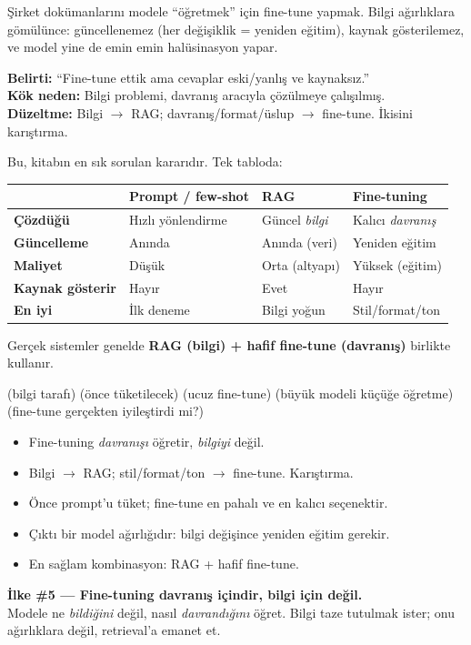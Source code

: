 \begin{antibox}
Şirket dokümanlarını modele ``öğretmek'' için fine-tune yapmak. Bilgi
ağırlıklara gömülünce: güncellenemez (her değişiklik = yeniden eğitim), kaynak
gösterilemez, ve model yine de emin emin halüsinasyon yapar.

\smallskip
\textbf{Belirti:} ``Fine-tune ettik ama cevaplar eski/yanlış ve kaynaksız.''\\
\textbf{Kök neden:} Bilgi problemi, davranış aracıyla çözülmeye çalışılmış.\\
\textbf{Düzeltme:} Bilgi $\to$ RAG; davranış/format/üslup $\to$ fine-tune. İkisini karıştırma.
\end{antibox}

Bu, kitabın en sık sorulan kararıdır. Tek tabloda:\par
\vspace{2pt}
\noindent\begin{tabularx}{\linewidth}{@{}>{\raggedright\arraybackslash}p{24mm} L L L@{}}
\toprule
{\sffamily\bfseries\small } &
{\sffamily\bfseries\small Prompt / few-shot} &
{\sffamily\bfseries\small RAG} &
{\sffamily\bfseries\small Fine-tuning} \\
\midrule
\textbf{Çözdüğü} & Hızlı yönlendirme & Güncel \emph{bilgi} & Kalıcı \emph{davranış} \\
\addlinespace[2pt]
\textbf{Güncelleme} & Anında & Anında (veri) & Yeniden eğitim \\
\addlinespace[2pt]
\textbf{Maliyet} & Düşük & Orta (altyapı) & Yüksek (eğitim) \\
\addlinespace[2pt]
\textbf{Kaynak gösterir} & Hayır & Evet & Hayır \\
\addlinespace[2pt]
\textbf{En iyi} & İlk deneme & Bilgi yoğun & Stil/format/ton \\
\bottomrule
\end{tabularx}
\vspace{3pt}
Gerçek sistemler genelde \textbf{RAG (bilgi) + hafif fine-tune (davranış)} birlikte kullanır.

 (bilgi tarafı) \tlsep {} (önce tüketilecek) \tlsep
{} (ucuz fine-tune) \tlsep {} (büyük modeli küçüğe öğretme) \tlsep
{} (fine-tune gerçekten iyileştirdi mi?)

\begin{itemize}
  \item Fine-tuning \emph{davranışı} öğretir, \emph{bilgiyi} değil.
  \item Bilgi $\to$ RAG; stil/format/ton $\to$ fine-tune. Karıştırma.
  \item Önce prompt'u tüket; fine-tune en pahalı ve en kalıcı seçenektir.
  \item Çıktı bir model ağırlığıdır: bilgi değişince yeniden eğitim gerekir.
  \item En sağlam kombinasyon: RAG + hafif fine-tune.
\end{itemize}

\begin{principlebox}
\textbf{İlke \#5 — Fine-tuning davranış içindir, bilgi için değil.}\\[4pt]
\normalsize Modele ne \emph{bildiğini} değil, nasıl \emph{davrandığını} öğret.
Bilgi taze tutulmak ister; onu ağırlıklara değil, retrieval'a emanet et.
\end{principlebox}
